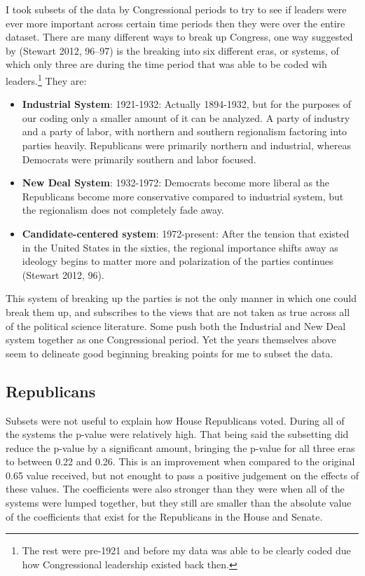 \documentclass[12pt,twoside]{reedthesis}
\providecommand{\tightlist}{%
  \setlength{\itemsep}{0pt}\setlength{\parskip}{0pt}}
\begin{document}
  I took subsets of the data by Congressional periods to try to see if
  leaders were ever more important across certain time periods then they
  were over the entire dataset. There are many different ways to break up
  Congress, one way suggested by (Stewart 2012, 96--97) is the breaking
  into six different eras, or systems, of which only three are during the
  time period that was able to be coded wih
  leaders.\footnote{The rest were pre-1921 and before my data was able to be clearly coded due how Congressional leadership existed back then.}
  They are:
  
  \begin{itemize}
  \tightlist
  \item
    \textbf{Industrial System}: 1921-1932: Actually 1894-1932, but for the
    purposes of our coding only a smaller amount of it can be analyzed. A
    party of industry and a party of labor, with northern and southern
    regionalism factoring into parties heavily. Republicans were primarily
    northern and industrial, whereas Democrats were primarily southern and
    labor focused.
  \item
    \textbf{New Deal System}: 1932-1972: Democrats become more liberal as
    the Republicans become more conservative compared to industrial
    system, but the regionalism does not completely fade away.
  \item
    \textbf{Candidate-centered system}: 1972-present: After the tension
    that existed in the United States in the sixties, the regional
    importance shifts away as ideology begins to matter more and
    polarization of the parties continues (Stewart 2012, 96).
  \end{itemize}
  
  This system of breaking up the parties is not the only manner in which
  one could break them up, and subscribes to the views that are not taken
  as true across all of the political science literature. Some push both
  the Industrial and New Deal system together as one Congressional period.
  Yet the years themselves above seem to delineate good beginning breaking
  points for me to subset the data.
  
  \subsection{Republicans}\label{republicans-1}
  
  Subsets were not useful to explain how House Republicans voted. During
  all of the systems the p-value were relatively high. That being said the
  subsetting did reduce the p-value by a significant amount, bringing the
  p-value for all three eras to between 0.22 and 0.26. This is an
  improvement when compared to the original 0.65 value received, but not
  enought to pass a positive judgement on the effects of these values. The
  coefficients were also stronger than they were when all of the systems
  were lumped together, but they still are smaller than the absolute value
  of the coefficients that exist for the Republicans in the House and
  Senate.
  
\end{document}
